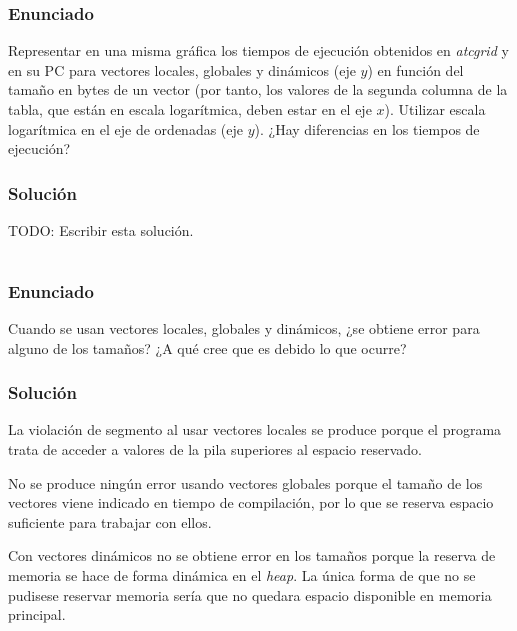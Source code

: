 \subsubsection{Enunciado}

Representar en una misma gráfica los tiempos de ejecución obtenidos en \textit{atcgrid} y en su PC para vectores locales, globales y dinámicos (eje $y$) en función del tamaño en bytes de un vector (por tanto, los valores de la segunda columna de la tabla, que están en escala logarítmica, deben estar en el eje $x$).
Utilizar escala logarítmica en el eje de ordenadas (eje $y$).
¿Hay diferencias en los tiempos de ejecución?

\subsubsection{Solución}

TODO\@: Escribir esta solución.

\section{}\label{ej1-9}

\subsubsection{Enunciado}

Cuando se usan vectores locales, globales y dinámicos, ¿se obtiene error para alguno de los tamaños?
¿A qué cree que es debido lo que ocurre?

\subsubsection{Solución}

La violación de segmento al usar vectores locales se produce porque el programa trata de acceder a valores de la pila superiores al espacio reservado.

No se produce ningún error usando vectores globales porque el tamaño de los vectores viene indicado en tiempo de compilación, por lo que se reserva espacio suficiente para trabajar con ellos.

Con vectores dinámicos no se obtiene error en los tamaños porque la reserva de memoria se hace de forma dinámica en el \textit{heap}.
La única forma de que no se pudisese reservar memoria sería que no quedara espacio disponible en memoria principal.

\section{}\label{ej1-10}

